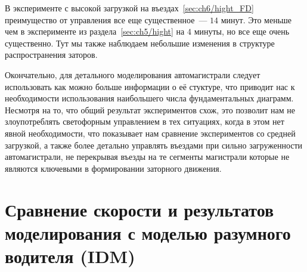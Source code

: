 В эксперименте с высокой загрузкой на въездах~\ref{sec:ch6/hight_FD} преимущество от управления все еще существенное~--- \(14\) минут.
Это меньше чем в эксперименте из раздела~\ref{sec:ch5/hight} на \(4\) минуты, но все еще очень существенно.
Тут мы также наблюдаем небольшие изменения в структуре распространения заторов.

Окончательно, для детального моделирования автомагистрали следует использовать как можно больше информации о её стуктуре, что приводит нас к необходимости использования наибольшего числа фундаментальных диаграмм.
Несмотря на то, что общий результат экспериментов схож, это позволит нам не злоупотреблять светофорным управлением в тех ситуациях, когда в этом нет явной необходимости, что показывает нам сравнение экспериментов со средней загрузкой,
а также более детально управлять въездами при сильно загруженности автомагистрали, не перекрывая въезды на те сегменты магистрали которые не являются ключевыми в формировании заторного движения.


\chapter{Сравнение скорости и результатов моделирования с моделью разумного водителя (IDM)}\label{sec:ch7}



\clearpage